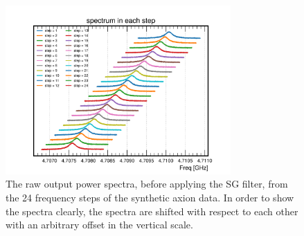 \begin{figure}[htbp]                                                                                                  
    \centering                                                                                                                       
    \includegraphics[width=8.6cm]{figures/faxion_rawpower_24steps.png}
 \caption{The raw output power spectra, before applying the 
 SG filter, from the 24 frequency steps of the synthetic axion 
data. In order to show the spectra clearly, the spectra are shifted 
with respect to each other with an arbitrary offset in the vertical scale.}                
\label{fig:faxionstep}                                                                                                            
\end{figure}                       

